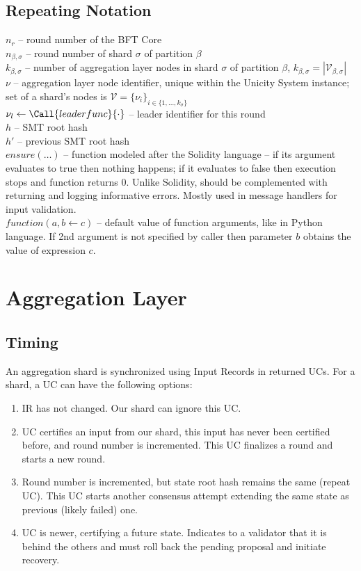 \section{Repeating Notation}\label{notation}

$n_r$ -- round number of the BFT Core\\
$n_{\beta, \sigma}$ -- round number of shard $\sigma$ of partition $\beta$\\
$k_{\beta, \sigma}$ -- number of aggregation layer nodes in shard $\sigma$ of partition $\beta$, $k_{\beta, \sigma} = |\mathcal{V}_{\beta, \sigma}| $\\
$\nu$ -- aggregation layer node identifier, unique within the Unicity System instance; set of a shard's nodes is $\mathcal{V} = \{\nu_i\}_{i\in \{1, \dots, k_\sigma\}}$ \\
$\nu_l \gets \Call{leaderfunc}{\cdot}$ -- leader identifier for this round \\
$h$ -- SMT root hash\\
$h'$ -- previous SMT root hash\\


$ensure(\ldots)$ -- function modeled after the Solidity language -- if its argument evaluates to true then nothing happens; if it evaluates to false then execution stops and function returns $0$. Unlike Solidity, should be complemented with returning and logging informative errors. Mostly used in message handlers for input validation. \\
$function(a, b \gets c)$ -- default value of function arguments, like in Python language. If 2nd argument is not specified by caller then parameter $b$ obtains the value of expression $c$.

\chapter{Aggregation Layer}\label{aggregation-layer}

\section{Timing}\label{HLCdetails-Timing}

An aggregation shard is synchronized using Input Records in returned UCs. For a shard, a UC can have
the following options:

\begin{enumerate}
\def\labelenumi{\arabic{enumi}.}
\item
  IR has not changed. Our shard can ignore this UC.
\item
  UC certifies an input from our shard, this input has never
  been certified before, and round number is incremented. This UC finalizes a round and starts a new round.
\item
  Round number is incremented, but state root hash remains the same (repeat UC). This UC starts another consensus attempt extending the same state as previous (likely failed) one.
  \item
  UC is newer, certifying a future state. Indicates to a validator that it is behind the others and must roll back the pending proposal and initiate recovery.
\end{enumerate}

